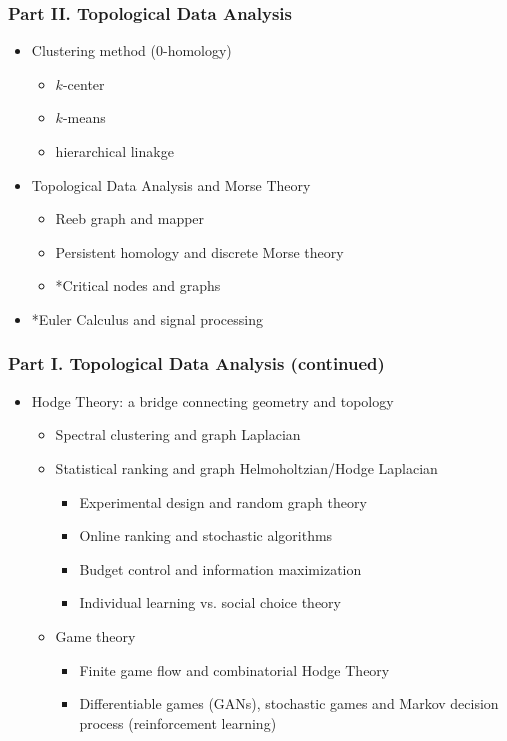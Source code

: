 \documentclass[10pt,mathserif]{beamer}
\begin{document}
\begin{frame}
\frametitle{Part II. Topological Data Analysis}
\begin{itemize}\itemsep=12pt
\item Clustering method (0-homology)
\vspace*{0.5em}
\begin{itemize}
\item $k$-center
\item $k$-means
\item hierarchical linakge
\end{itemize}
\vspace*{0.5em}
\item Topological Data Analysis and Morse Theory
\vspace*{0.5em}
\begin{itemize}
\item Reeb graph and mapper
\item Persistent homology and discrete Morse theory
\item *Critical nodes and graphs
\end{itemize}
\item *Euler Calculus and signal processing
\end{itemize}
\end{frame}

\begin{frame}
\frametitle{Part I. Topological Data Analysis (continued)}
\begin{itemize}\itemsep=12pt
\item Hodge Theory: a bridge connecting geometry and topology
\vspace*{0.5em}
\begin{itemize}
\item Spectral clustering and graph Laplacian
\item Statistical ranking and graph Helmoholtzian/Hodge Laplacian
\begin{itemize}
\item Experimental design and random graph theory
\item Online ranking and stochastic algorithms
\item Budget control and information maximization
\item Individual learning vs. social choice theory
\end{itemize}
\item Game theory
\vspace*{0.5em}
\begin{itemize}
\item Finite game flow and combinatorial Hodge Theory
\item Differentiable games (GANs), stochastic games and Markov decision process (reinforcement learning)
\end{itemize}
\end{itemize}
\end{itemize}
\end{frame}
\end{document}
